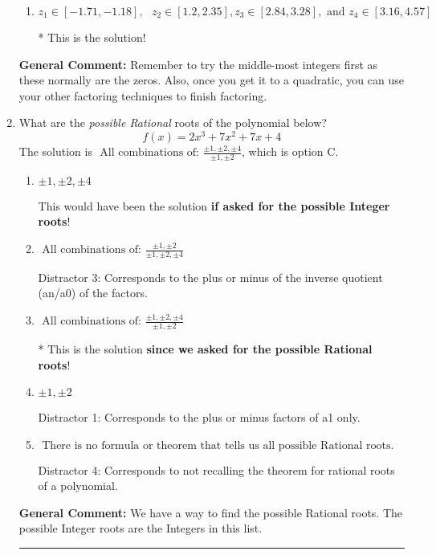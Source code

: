 \documentclass{extbook}[14pt]
\newcommand{\litem}[1]{\item #1

\rule{\textwidth}{0.4pt}}
\begin{document}
\begin{enumerate}
{\begin{enumerate}[label=\Alph*.]
 Distractor 1: Corresponds to negatives of all zeros.
\item \( z_1 \in [-1.71, -1.18], \text{   }  z_2 \in [1.2, 2.35], z_3 \in [2.84, 3.28], \text{   and   } z_4 \in [3.16, 4.57] \)

* This is the solution!
\end{enumerate}

\textbf{General Comment:} Remember to try the middle-most integers first as these normally are the zeros. Also, once you get it to a quadratic, you can use your other factoring techniques to finish factoring.
}
\litem{
What are the \textit{possible Rational} roots of the polynomial below?
\[ f(x) = 2x^{3} +7 x^{2} +7 x + 4 \]The solution is \( \text{ All combinations of: }\frac{\pm 1,\pm 2,\pm 4}{\pm 1,\pm 2} \), which is option C.\begin{enumerate}[label=\Alph*.]
\item \( \pm 1,\pm 2,\pm 4 \)

This would have been the solution \textbf{if asked for the possible Integer roots}!
\item \( \text{ All combinations of: }\frac{\pm 1,\pm 2}{\pm 1,\pm 2,\pm 4} \)

 Distractor 3: Corresponds to the plus or minus of the inverse quotient (an/a0) of the factors. 
\item \( \text{ All combinations of: }\frac{\pm 1,\pm 2,\pm 4}{\pm 1,\pm 2} \)

* This is the solution \textbf{since we asked for the possible Rational roots}!
\item \( \pm 1,\pm 2 \)

 Distractor 1: Corresponds to the plus or minus factors of a1 only.
\item \( \text{ There is no formula or theorem that tells us all possible Rational roots.} \)

 Distractor 4: Corresponds to not recalling the theorem for rational roots of a polynomial.
\end{enumerate}

\textbf{General Comment:} We have a way to find the possible Rational roots. The possible Integer roots are the Integers in this list.
}
\end{enumerate}
\end{document}
